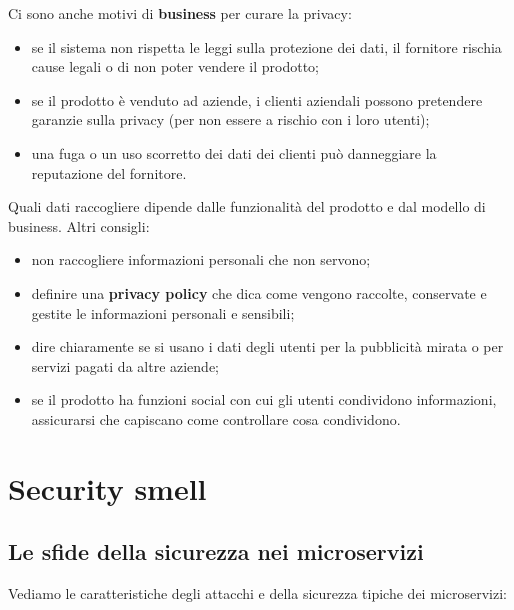 Ci sono anche motivi di \textbf{business} per curare la privacy:

\begin{itemize}
\tightlist
\item
  se il sistema non rispetta le leggi sulla protezione dei dati, il
  fornitore rischia cause legali o di non poter vendere il prodotto;
\item
  se il prodotto è venduto ad aziende, i clienti aziendali possono
  pretendere garanzie sulla privacy (per non essere a rischio con i loro
  utenti);
\item
  una fuga o un uso scorretto dei dati dei clienti può danneggiare la
  reputazione del fornitore.
\end{itemize}

Quali dati raccogliere dipende dalle funzionalità del prodotto e dal
modello di business. Altri consigli:

\begin{itemize}
\tightlist
\item
  non raccogliere informazioni personali che non servono;
\item
  definire una \textbf{privacy policy} che dica come vengono raccolte,
  conservate e gestite le informazioni personali e sensibili;
\item
  dire chiaramente se si usano i dati degli utenti per la pubblicità
  mirata o per servizi pagati da altre aziende;
\item
  se il prodotto ha funzioni social con cui gli utenti condividono
  informazioni, assicurarsi che capiscano come controllare cosa
  condividono.
\end{itemize}

\section{Security smell}\label{security-smell}

\subsection{Le sfide della sicurezza nei
microservizi}\label{le-sfide-della-sicurezza-nei-microservizi}

Vediamo le caratteristiche degli attacchi e della sicurezza tipiche dei
microservizi:

